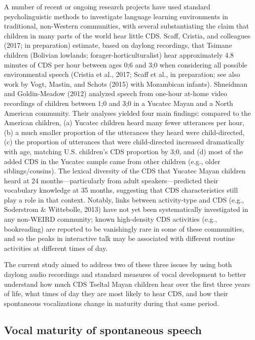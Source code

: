 \documentclass[floatsintext,man]{apa6}
\theoremstyle{definition}
\theoremstyle{definition}
\theoremstyle{definition}
\theoremstyle{remark}
\begin{document}
A number of recent or ongoing research projects have used standard
psycholinguistic methods to investigate language learning environments
in traditional, non-Western communities, with several substantiating the
claim that children in many parts of the world hear little CDS. Scaff,
Cristia, and colleagues (2017; in preparation) estimate, based on
daylong recordings, that Tsimane children (Bolivian lowlands;
forager-horticulturalist) hear approximately 4.8 minutes of CDS per hour
between ages 0;6 and 3;0 when considering all possible environmental
speech (Cristia et al., 2017; Scaff et al., in preparation; see also
work by Vogt, Mastin, and Schots (2015) with Mozambican infants).
Shneidman and Goldin-Meadow (2012) analyzed speech from one-hour at-home
video recordings of children between 1;0 and 3;0 in a Yucatec Mayan and
a North American community. Their analyses yielded four main findings:
compared to the American children, (a) Yucatec children heard many fewer
utterances per hour, (b) a much smaller proportion of the utterances
they heard were child-directed, (c) the proportion of utterances that
were child-directed increased dramatically with age, matching U.S.
children's CDS proportion by 3;0, and (d) most of the added CDS in the
Yucatec sample came from other children (e.g., older siblings/cousins).
The lexical diversity of the CDS that Yucatec Mayan children heard at 24
months---particularly from adult speakers---predicted their vocabulary
knowledge at 35 months, suggesting that CDS characteristics still play a
role in that context. Notably, links between activity-type and CDS
(e.g., Soderstrom \& Wittebolle, 2013) have not yet been systematically
investigated in any non-WEIRD community; known high-density CDS
activities (e.g., bookreading) are reported to be vanishingly rare in
some of these communities, and so the peaks in interactive talk may be
associated with different routine activities at different times of day.

The current study aimed to address two of these three issues by using
both daylong audio recordings and standard measures of vocal development
to better understand how much CDS Tseltal Mayan children hear over the
first three years of life, what times of day they are most likely to
hear CDS, and how their spontaneous vocalizations change in maturity
during that same period.

\subsection{Vocal maturity of spontaneous
speech}\label{vocal-maturity-of-spontaneous-speech}
\end{document}
